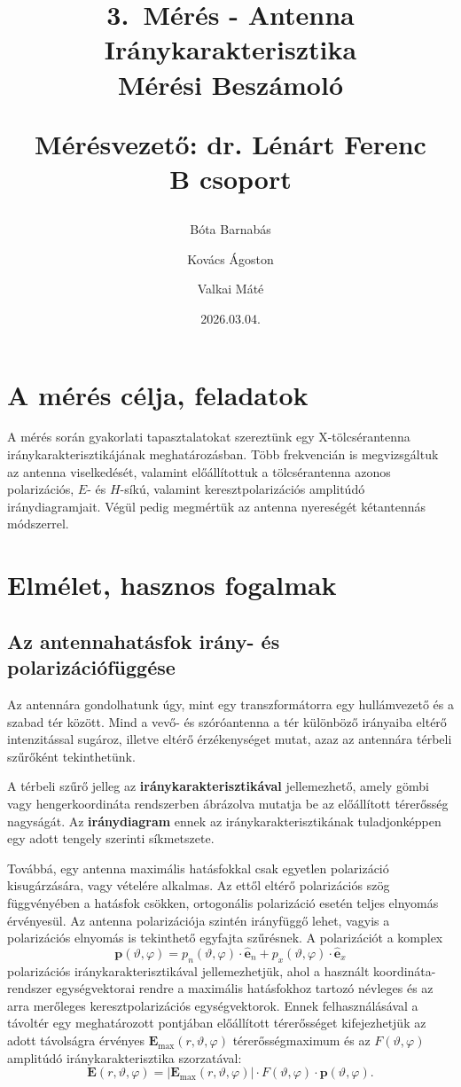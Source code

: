 \documentclass{article}
\title{
3.~Mérés - Antenna Iránykarakterisztika\\Mérési Beszámoló\vspace{1em}

\large Mérésvezető: dr. Lénárt Ferenc\\ B csoport}
\author{Bóta Barnabás \and Kovács Ágoston \and Valkai Máté}
\date{2026.03.04.}
\newcommand{\parrtp}{\left(r,\vartheta,\varphi\right)}
\newcommand{\partp}{\left(\vartheta,\varphi\right)}
\begin{document}
\maketitle
\tableofcontents{}
\section{A mérés célja, feladatok}
A mérés során gyakorlati tapasztalatokat szereztünk egy X-tölcsérantenna iránykarakterisztikájának meghatározásban. Több frekvencián is megvizsgáltuk az antenna viselkedését, valamint előállítottuk a tölcsérantenna azonos polarizációs, $E$- és $H$-síkú, valamint keresztpolarizációs amplitúdó iránydiagramjait. Végül pedig megmértük az antenna nyereségét kétantennás módszerrel.
\section{Elmélet, hasznos fogalmak}
\subsection{Az antennahatásfok irány- és polarizációfüggése}
Az antennára gondolhatunk úgy, mint egy transzformátorra egy hullámvezető és a szabad tér között. Mind a vevő- és szóróantenna a tér különböző irányaiba eltérő intenzitással sugároz, illetve eltérő érzékenységet mutat, azaz az antennára térbeli szűrőként tekinthetünk. 

A térbeli szűrő jelleg az  \textbf{iránykarakterisztikával} jellemezhető, amely gömbi vagy hengerkoordináta rendszerben ábrázolva mutatja be az előállított térerősség nagyságát. Az \textbf{iránydiagram} ennek az iránykarakterisztikának tuladjonképpen egy adott tengely szerinti síkmetszete.

Továbbá, egy antenna maximális hatásfokkal csak egyetlen polarizáció kisugárzására, vagy
vételére alkalmas. Az ettől eltérő polarizációs szög függvényében a hatásfok csökken,
ortogonális polarizáció esetén teljes elnyomás érvényesül. Az antenna polarizációja szintén irányfüggő lehet, vagyis a polarizációs elnyomás is tekinthető egyfajta szűrésnek. A polarizációt a komplex
\begin{equation}
\mathbf{p}\partp=p_n\partp\cdot\mathbf{\hat e}_n+p_x\partp\cdot\mathbf{\hat e}_x
\label{eq:polar}
\end{equation}
polarizációs iránykarakterisztikával jellemezhetjük, ahol a használt koordináta-rendszer egységvektorai rendre a maximális hatásfokhoz tartozó névleges és az arra merőleges keresztpolarizációs egységvektorok.
Ennek felhasználásával a távoltér egy meghatározott pontjában előállított térerősséget kifejezhetjük az adott távolságra érvényes $\mathbf{E}_\text{max}\parrtp$ térerősségmaximum és az $F\partp$ amplitúdó iránykarakterisztika szorzatával:
\begin{equation}
\mathbf E\parrtp=\left|\mathbf{E}_\text{max}\parrtp \right|\cdot F\partp\cdot\mathbf{p}\partp.
\label{eq:field}
\end{equation}
\end{document}
